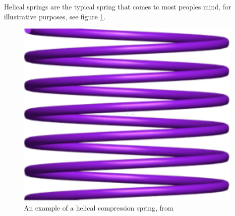 \documentclass[10pt]{article}
\begin{document}
Helical springs are the typical spring that comes to most peoples mind, for illustrative purposes, see figure \ref{Spring}. 

		\begin{figure}[h]
		 \begin{center}\includegraphics[scale=.2]{Spring.png}\end{center}
		 \caption{An example of a helical compression spring, from \cite{Massad2015}}
		 \label{Spring}
		 
		 \end{figure}
\end{document}
